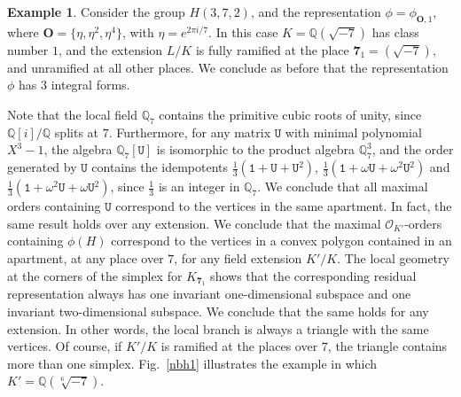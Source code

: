 \documentclass{article}
\theoremstyle{definition}
\newtheorem{ex}[prop]{Example}
\begin{document}
\begin{ex}\label{e1}
   Consider the group $H(3,7,2)$, and the representation
   $\phi=\phi_{\mathbf{O},1}$, where 
   $\mathbf{O}=\{\eta,\eta^2,\eta^4\}$, with $\eta=e^{2\pi i/7}$. 
   In this case $K=\mathbb{Q}(\sqrt{-7})$ has class number $1$, 
   and the extension $L/K$ is fully ramified at the place 
   $\mathbf{7}_1=(\sqrt{-7})$, and unramified at 
   all other places. We conclude as before that the representation $\phi$
   has $3$ integral forms.

  Note that the local field $\mathbb{Q}_7$ contains the primitive
  cubic roots of unity, since $\mathbb{Q}[i]/\mathbb{Q}$ splits at $7$.
  Furthermore, for any matrix $\mathtt{U}$
  with minimal polynomial $X^3-1$, the algebra $\mathbb{Q}_7[\mathtt{U}]$
  is isomorphic to the product algebra $\mathbb{Q}_7^3$,
  and the order generated by $\mathtt{U}$ contains the idempotents
  $\frac13(\mathtt{1}+\mathtt{U}+\mathtt{U}^2)$,
  $\frac13(\mathtt{1}+\omega\mathtt{U}+\omega^2\mathtt{U}^2)$
  and $\frac13(\mathtt{1}+\omega^2\mathtt{U}+\omega\mathtt{U}^2)$,
  since $\frac13$ is an integer in $\mathbb{Q}_7$. We conclude that
  all maximal orders containing $\mathtt{U}$ correspond to the vertices in
  the same apartment. In fact, the same result holds over any 
  extension. We 
  conclude that the maximal $\mathcal{O}_{K'}$-orders containing $\phi(H)$
  correspond to the vertices in a convex polygon contained 
  in an apartment, 
  at any place over $7$, for any field extension $K'/K$.
  The local geometry at the corners of the simplex for
  $K_{\mathbf{7}_1}$ shows that the corresponding residual 
  representation always has one invariant one-dimensional subspace 
  and one invariant two-dimensional subspace.
  We conclude that the same holds for any extension.
  In other words, the local branch is always a triangle
  with the same vertices. Of course, if $K'/K$ is ramified at the
  places over $7$, the triangle contains more than one simplex.
  Fig.~\ref{nbh1} illustrates the example in which 
  $K'=\mathbb{Q}(\sqrt[6]{-7})$.
  \begin{figure}[h!]\label{f1}
\begin{center}
\end{center}
\end{figure}
\end{ex}
\end{document}
